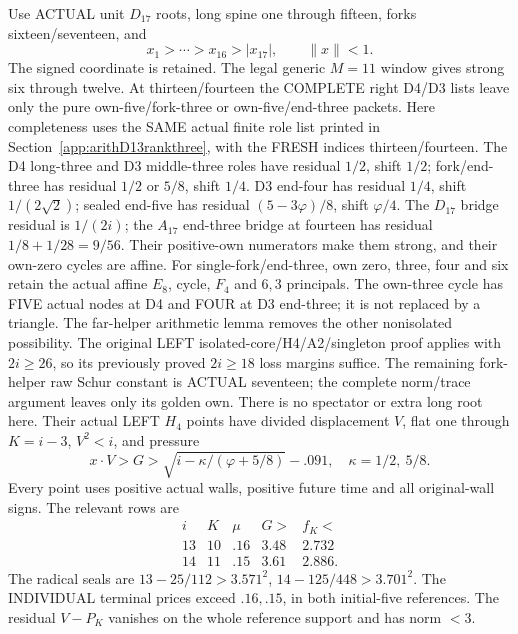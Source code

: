 \documentclass[11pt]{article}
\begin{document}
Use ACTUAL unit \(D_{17}\) roots, long spine one
through fifteen, forks sixteen/seventeen, and
\[
 x_1>\cdots>x_{16}>|x_{17}|,\qquad\|x\|<1 .
\]
The signed coordinate is retained.
The legal generic \(M=11\) window gives strong
six through twelve.
At thirteen/fourteen the COMPLETE right D4/D3
lists leave only the pure own-five/fork-three
or own-five/end-three packets.
Here completeness uses the SAME actual finite
role list printed in Section~\ref{app:arithD13rankthree},
with the FRESH indices thirteen/fourteen.
The D4 long-three and D3 middle-three roles have
residual \(1/2\), shift \(1/2\);
fork/end-three has residual \(1/2\) or \(5/8\),
shift \(1/4\).
D3 end-four has residual \(1/4\), shift
\(1/(2\sqrt2)\); sealed end-five has residual
\((5-3\varphi)/8\), shift \(\varphi/4\).
The \(D_{17}\) bridge residual is \(1/(2i)\);
the \(A_{17}\) end-three bridge at fourteen
has residual \(1/8+1/28=9/56\).
Their positive-own numerators make them strong,
and their own-zero cycles are affine.
For single-fork/end-three, own zero, three,
four and six retain the actual affine \(E_8\),
cycle, \(F_4\) and \(6,3\) principals.
The own-three cycle has FIVE actual nodes at
D4 and FOUR at D3 end-three; it is not
replaced by a triangle.
The far-helper arithmetic lemma removes the
other nonisolated possibility.
The original LEFT isolated-core/H4/A2/singleton
proof applies with \(2i\ge26\), so its previously
proved \(2i\ge18\) loss margins suffice.
The remaining fork-helper raw Schur constant
is ACTUAL seventeen; the complete norm/trace
argument leaves only its golden own.
There is no spectator or extra long root here.
Their actual LEFT \(H_4\) points have divided
displacement \(V\), flat one through \(K=i-3\),
\(V^2<i\), and pressure
\[
 x\cdot V>G>\sqrt{i-\kappa/(\varphi+5/8)}-.091,\quad
 \kappa=1/2,\ 5/8 .
\]
Every point uses positive actual walls, positive
future time and all original-wall signs.
The relevant rows are
\[
\begin{array}{c|c|c|c|c}
 i&K&\mu&G>&f_K<\\ \hline
13&10&.16&3.48&2.732\\
14&11&.15&3.61&2.886 .
\end{array}
\]
The radical seals are
\(13-25/112>3.571^2\),
\(14-125/448>3.701^2\).
The INDIVIDUAL terminal prices exceed
\(.16,.15\), in both initial-five references.
The residual \(V-P_K\) vanishes on the whole
reference support and has norm \(<3\).
\end{document}
